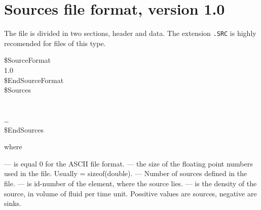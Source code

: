 %
%
%
%

\section*{Sources file format, version 1.0}
The file is divided in two sections, header and data.
The extension {\tt .SRC} is highly recomended for files of this type.
\begin{fileformat}
\$SourceFormat\\
  1.0  \\
\$EndSourceFormat\\
\$Sources\\
  \\
   \\
  \dots\\
\$EndSources\\
\end{fileformat}
where
\begin{description}
  --- is equal 0 for the ASCII file format.
  --- the size of the floating point numbers used in
  the file. Usually  = sizeof(double).
  --- Number of sources defined in the
  file.
  --- is id-number of the element, where the source lies.
  --- is the density of the source, in volume of fluid
   per time unit. Possitive values are sources, negative are sinks.
\end{description}

